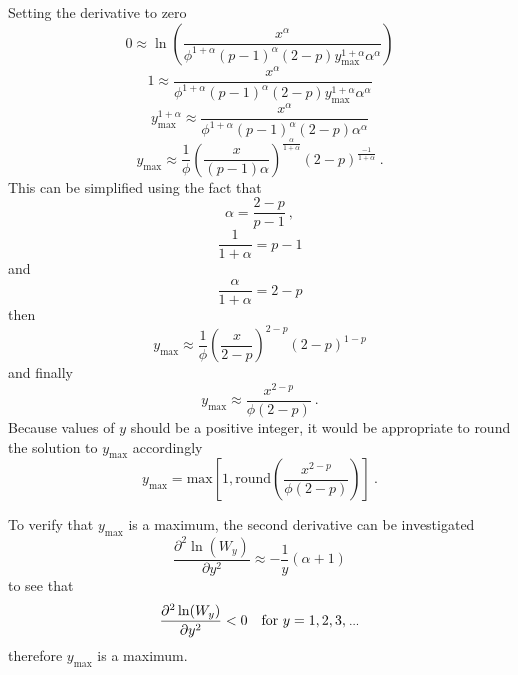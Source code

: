 Setting the derivative to zero
\begin{equation*}
  0 \approx \ln\left(
    \frac{
      x^\alpha
    }
    {
      \phi^{1+\alpha}(p-1)^\alpha(2-p)y_{\text{max}}^{1+\alpha}\alpha^\alpha
    }
  \right)
\end{equation*}
\begin{equation*}
  1 \approx 
  \frac{x^\alpha}{\phi^{1+\alpha}(p-1)^\alpha(2-p)y_{\text{max}}^{1+\alpha}\alpha^\alpha}
\end{equation*}
\begin{equation*}
  y_{\text{max}}^{1+\alpha} \approx 
  \frac{x^\alpha}{\phi^{1+\alpha}(p-1)^\alpha(2-p)\alpha^\alpha}
\end{equation*}
\begin{equation*}
  y_{\text{max}} \approx 
  \frac{1}{\phi}
  \left(
    \frac{x}{(p-1)\alpha}
  \right)^{\frac{\alpha}{1+\alpha}}
  (2-p)^{\frac{-1}{1+\alpha}}
  \ .
\end{equation*}
This can be simplified using the fact that 
\begin{equation*}
  \alpha=\frac{2-p}{p-1}
  \ ,
\end{equation*}
\begin{equation*}
  \frac{1}{1+\alpha} = p-1
\end{equation*}
and
\begin{equation*}
  \frac{\alpha}{1+\alpha} = 2-p
\end{equation*}
then
\begin{equation*}
  y_{\text{max}} \approx 
  \frac{1}{\phi}
  \left(
    \frac{x}{2-p}
  \right)^{2-p}
  (2-p)^{1-p}
\end{equation*}
and finally
\begin{equation}
  y_{\text{max}} \approx \frac{x^{2-p}}{\phi(2-p)}
  \ .
\end{equation}
Because values of $y$ should be a positive integer, it would be appropriate to round the solution to $y_\text{max}$ accordingly
\begin{equation}
  y_{\text{max}} = \text{max}\left[
    1,\text{round}\left(\frac{x^{2-p}}{\phi(2-p)}\right)
  \right]
  \ .
\end{equation}

To verify that $y_\text{max}$ is a maximum, the second derivative can be investigated
\begin{equation}
  \frac{\partial^2\ln(W_y)}{\partial y^2}
  \approx
  -\frac{1}{y}(\alpha+1)
\end{equation}
to see that
\begin{equation}
  \frac{\partial^2\ln(W_y)}{\partial y^2} < 0 \quad \text{for }y=1,2,3,\dotdotdot
\end{equation}
therefore $y_\text{max}$ is a maximum.

